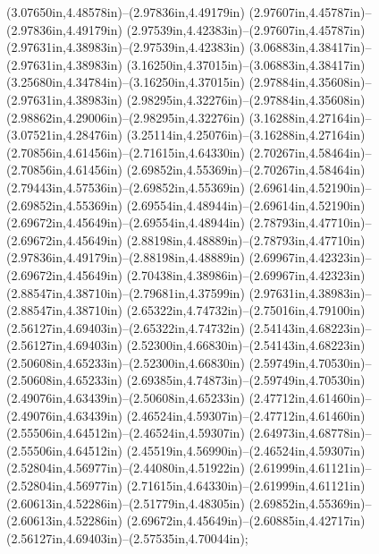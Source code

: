 (3.07650in,4.48578in)--(2.97836in,4.49179in) (2.97607in,4.45787in)--(2.97836in,4.49179in) (2.97539in,4.42383in)--(2.97607in,4.45787in) (2.97631in,4.38983in)--(2.97539in,4.42383in) (3.06883in,4.38417in)--(2.97631in,4.38983in) (3.16250in,4.37015in)--(3.06883in,4.38417in) (3.25680in,4.34784in)--(3.16250in,4.37015in) (2.97884in,4.35608in)--(2.97631in,4.38983in) (2.98295in,4.32276in)--(2.97884in,4.35608in) (2.98862in,4.29006in)--(2.98295in,4.32276in) (3.16288in,4.27164in)--(3.07521in,4.28476in) (3.25114in,4.25076in)--(3.16288in,4.27164in) (2.70856in,4.61456in)--(2.71615in,4.64330in) (2.70267in,4.58464in)--(2.70856in,4.61456in) (2.69852in,4.55369in)--(2.70267in,4.58464in) (2.79443in,4.57536in)--(2.69852in,4.55369in) (2.69614in,4.52190in)--(2.69852in,4.55369in) (2.69554in,4.48944in)--(2.69614in,4.52190in) (2.69672in,4.45649in)--(2.69554in,4.48944in) (2.78793in,4.47710in)--(2.69672in,4.45649in) (2.88198in,4.48889in)--(2.78793in,4.47710in) (2.97836in,4.49179in)--(2.88198in,4.48889in) (2.69967in,4.42323in)--(2.69672in,4.45649in) (2.70438in,4.38986in)--(2.69967in,4.42323in) (2.88547in,4.38710in)--(2.79681in,4.37599in) (2.97631in,4.38983in)--(2.88547in,4.38710in) (2.65322in,4.74732in)--(2.75016in,4.79100in) (2.56127in,4.69403in)--(2.65322in,4.74732in) (2.54143in,4.68223in)--(2.56127in,4.69403in) (2.52300in,4.66830in)--(2.54143in,4.68223in) (2.50608in,4.65233in)--(2.52300in,4.66830in) (2.59749in,4.70530in)--(2.50608in,4.65233in) (2.69385in,4.74873in)--(2.59749in,4.70530in) (2.49076in,4.63439in)--(2.50608in,4.65233in) (2.47712in,4.61460in)--(2.49076in,4.63439in) (2.46524in,4.59307in)--(2.47712in,4.61460in) (2.55506in,4.64512in)--(2.46524in,4.59307in) (2.64973in,4.68778in)--(2.55506in,4.64512in) (2.45519in,4.56990in)--(2.46524in,4.59307in) (2.52804in,4.56977in)--(2.44080in,4.51922in) (2.61999in,4.61121in)--(2.52804in,4.56977in) (2.71615in,4.64330in)--(2.61999in,4.61121in) (2.60613in,4.52286in)--(2.51779in,4.48305in) (2.69852in,4.55369in)--(2.60613in,4.52286in) (2.69672in,4.45649in)--(2.60885in,4.42717in) (2.56127in,4.69403in)--(2.57535in,4.70044in);
